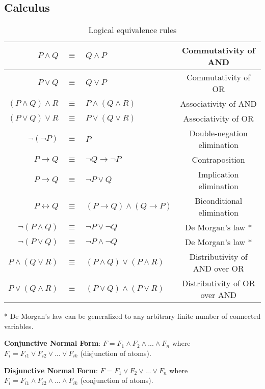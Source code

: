 \documentclass[]{article}
\begin{document}
\subsection{Calculus}

\begin{table}[h]
	\centering
	\caption{Logical equivalence rules}
	\begin{tabular}{ | r  c  l  c | } 
		\hline
		$P \land Q$ & $\equiv$ & $Q \land P$ & Commutativity of AND\\
		\hline
		$P \lor Q$ & $\equiv$ & $Q \lor P$ & Commutativity of OR\\
		\hline
		$(P \land Q) \land R$ & $\equiv$ & $P \land (Q \land R)$ & Associativity of AND\\
		\hline
		$(P \lor Q) \lor R$ & $\equiv$ & $P \lor (Q \lor R)$ & Associativity of OR\\
		\hline
		$\neg(\neg P)$ & $\equiv$ & $P$ & Double-negation elimination\\
		\hline
		$P \rightarrow Q$ & $\equiv$ & $\neg Q \rightarrow \neg P$ & Contraposition\\
		\hline
		$P \rightarrow Q$ & $\equiv$ & $\neg P \lor Q$ & Implication elimination\\
		\hline
		$P \leftrightarrow Q$ & $\equiv$ & $(P \rightarrow Q) \land (Q \rightarrow P)$ & Biconditional elimination \\
		\hline
		$\neg(P \land Q)$ & $\equiv$ & $\neg P \lor \neg Q$ & De Morgan's law *\\
		\hline
		$\neg(P \lor Q)$ & $\equiv$ & $\neg P \land \neg Q$ & De Morgan's law *\\
		\hline
		$P \land (Q \lor R)$ & $\equiv$ & $(P \land Q) \lor (P \land R)$ & Distributivity of AND over OR\\
		\hline
		$P \lor (Q \land R)$ & $\equiv$ & $(P \lor Q) \land (P \lor R)$ & Distributivity of OR over AND\\
		\hline
	\end{tabular}

	* De Morgan's law can be generalized to any arbitrary finite number of connected variables.
\end{table}

\noindent \textbf{Conjunctive Normal Form}: $F = F_1 \land F_2 \land ... \land F_n $ where $F_i = F_{i1} \lor F_{i2} \lor ... \lor F_{ik} $ (disjunction of atoms).

\noindent \textbf{Disjunctive Normal Form}: $F = F_1 \lor F_2 \lor ... \lor F_n $ where $F_i = F_{i1} \land F_{i2} \land ... \land F_{ik} $ (conjunction of atoms).
\end{document}
